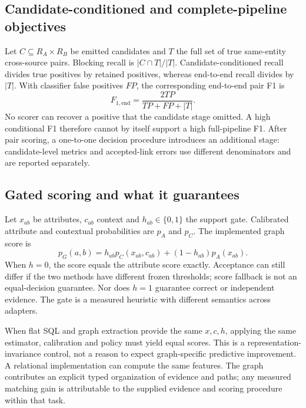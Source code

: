 \documentclass[11pt,letterpaper]{article}
\begin{document}
\subsection{Candidate-conditioned and complete-pipeline objectives}
Let $C\subseteq R_A\times R_B$ be emitted candidates and $T$ the full set of true same-entity cross-source pairs. Blocking recall is $|C\cap T|/|T|$. Candidate-conditioned recall divides true positives by retained positives, whereas end-to-end recall divides by $|T|$. With classifier false positives $FP$, the corresponding end-to-end pair F1 is
\begin{equation}
 F_{1,\mathrm{end}}=\frac{2TP}{TP+FP+|T|}.
\end{equation}
No scorer can recover a positive that the candidate stage omitted. A high conditional F1 therefore cannot by itself support a high full-pipeline F1. After pair scoring, a one-to-one decision procedure introduces an additional stage: candidate-level metrics and accepted-link errors use different denominators and are reported separately.

\subsection{Gated scoring and what it guarantees}
Let $x_{ab}$ be attributes, $c_{ab}$ context and $h_{ab}\in\{0,1\}$ the support gate. Calibrated attribute and contextual probabilities are $p_A$ and $p_C$. The implemented graph score is
\begin{equation}\label{eq:gate}
 p_G(a,b)=h_{ab}p_C(x_{ab},c_{ab})+(1-h_{ab})p_A(x_{ab}).
\end{equation}
When $h=0$, the score equals the attribute score exactly. Acceptance can still differ if the two methods have different frozen thresholds; score fallback is not an equal-decision guarantee. Nor does $h=1$ guarantee correct or independent evidence. The gate is a measured heuristic with different semantics across adapters.

When flat SQL and graph extraction provide the same $x,c,h$, applying the same estimator, calibration and policy must yield equal scores. This is a representation-invariance control, not a reason to expect graph-specific predictive improvement. A relational implementation can compute the same features. The graph contributes an explicit typed organization of evidence and paths; any measured matching gain is attributable to the supplied evidence and scoring procedure within that task.
\end{document}
